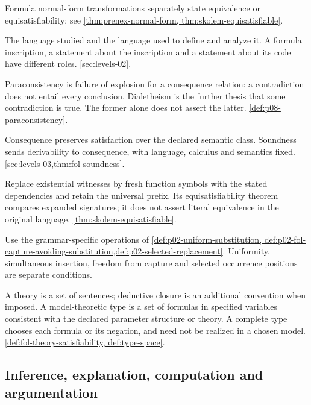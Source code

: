 \begin{description}[style=nextline,leftmargin=0pt]
Formula normal-form transformations separately state equivalence or
equisatisfiability; see \cref{thm:prenex-normal-form,
thm:skolem-equisatisfiable}.
\item[Object language; metalanguage.]
The language studied and the language used to define and analyze it.
A formula inscription, a statement about the inscription and a statement
about its code have different roles. \cref{sec:levels-02}.
\item[Paraconsistency; explosion; dialetheism.]
Paraconsistency is failure of explosion for a consequence relation: a
contradiction does not entail every conclusion. Dialetheism is the further
thesis that some contradiction is true. The former alone does not assert
the latter. \cref{def:p08-paraconsistency}.
\item[Semantic consequence; soundness.]
Consequence preserves satisfaction over the declared semantic class.
Soundness sends derivability to consequence, with language, calculus and
semantics fixed. \cref{sec:levels-03,thm:fol-soundness}.
\item[Skolemization.]
Replace existential witnesses by fresh function symbols with the stated
dependencies and retain the universal prefix. Its equisatisfiability theorem
compares expanded signatures; it does not assert literal equivalence in
the original language. \cref{thm:skolem-equisatisfiable}.
\item[Substitution; selected replacement.]
Use the grammar-specific operations of
\cref{def:p02-uniform-substitution,
def:p02-fol-capture-avoiding-substitution,def:p02-selected-replacement}.
Uniformity, simultaneous insertion, freedom from capture and selected
occurrence positions are separate conditions.
\item[Theory; type.]
A theory is a set of sentences; deductive closure is an additional
convention when imposed. A model-theoretic type is a set of formulas in
specified variables consistent with the declared parameter structure or
theory. A complete type chooses each formula or its negation, and need
not be realized in a chosen model. \cref{def:fol-theory-satisfiability,
def:type-space}.
\end{description}

\subsection{Inference, explanation, computation and argumentation}
\label{sec:p14-glossary-inference}

